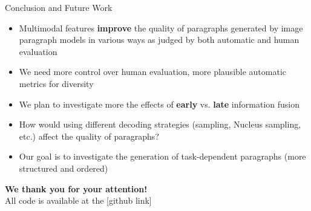 \documentclass[notes=hide]{beamer}
\begin{document}
\begin{frame}{Conclusion and Future Work}
\small
\begin{itemize}
\item Multimodal features \textbf{improve} the quality of paragraphs generated by image paragraph models in various ways as judged by both automatic and human evaluation
\pause
\item We need more control over human evaluation, more plausible automatic metrics for diversity
\pause
\item We plan to investigate more the effects of \textbf{early} vs. \textbf{late} information fusion
\pause
\item How would using different decoding strategies (sampling, Nucleus sampling, etc.) affect the quality of paragraphs?
\pause
\item Our goal is to investigate the generation of task-dependent paragraphs (more structured and ordered)
\end{itemize}
\end{frame}

\begin{frame}{}
\center
\textbf{We thank you for your attention!}\\
All code is available at the [github link]
\end{frame}
\end{document}
